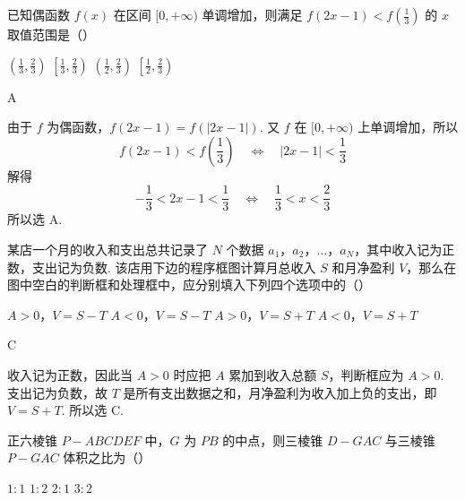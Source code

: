 \begin{problem}
已知偶函数 \( f(x) \) 在区间 \([0, +\infty)\) 单调增加，则满足 \( f(2x - 1) < f\left(\frac{1}{3}\right) \) 的 \( x \) 取值范围是（\quad）

\choices
    {\(\left(\frac{1}{3}, \frac{2}{3}\right)\)}
    {\(\left[\frac{1}{3}, \frac{2}{3}\right)\)}
    {\(\left(\frac{1}{2}, \frac{2}{3}\right)\)}
    {\(\left[\frac{1}{2}, \frac{2}{3}\right)\)}
\end{problem}

\begin{answer}
A
\end{answer}

\begin{solution}
由于 \(f\) 为偶函数，\(f(2x-1)=f(|2x-1|)\). 又 \(f\) 在 \([0,+\infty)\) 上单调增加，所以
\[
f(2x-1)<f\left(\frac13\right)\quad\Longleftrightarrow\quad |2x-1|<\frac13
\]
解得
\[
-\frac13<2x-1<\frac13\quad\Longleftrightarrow\quad \frac13<x<\frac23
\]
所以选 A.
\end{solution}

\begin{problem}
某店一个月的收入和支出总共记录了 \(N\) 个数据 \(a_1\)，\(a_2\)，\(\dots\)，\(a_N\)，其中收入记为正数，支出记为负数. 该店用下边的程序框图计算月总收入 \(S\) 和月净盈利 \(V\)，那么在图中空白的判断框和处理框中，应分别填入下列四个选项中的（\quad）


\choices
    {\(A > 0\)，\(V = S - T\)}
    {\(A < 0\)，\(V = S - T\)}
    {\(A > 0\)，\(V = S + T\)}
    {\(A < 0\)，\(V = S + T\)}
\end{problem}

\begin{answer}
C
\end{answer}

\begin{solution}
收入记为正数，因此当 \(A>0\) 时应把 \(A\) 累加到收入总额 \(S\)，判断框应为 \(A>0\). 支出记为负数，故 \(T\) 是所有支出数据之和，月净盈利为收入加上负的支出，即 \(V=S+T\). 所以选 C.
\end{solution}

\begin{problem}
正六棱锥 \(P - ABCDEF\) 中，\(G\) 为 \(PB\) 的中点，则三棱锥 \(D - GAC\) 与三棱锥 \(P - GAC\) 体积之比为（\quad）

\choices
    {\(1: 1\)}
    {\(1:2\)}
    {\(2: 1\)}
    {\(3:2\)}
\end{problem}


